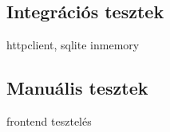 \subsection{Integrációs tesztek}
httpclient, sqlite inmemory

\subsection{Manuális tesztek}
frontend tesztelés






























